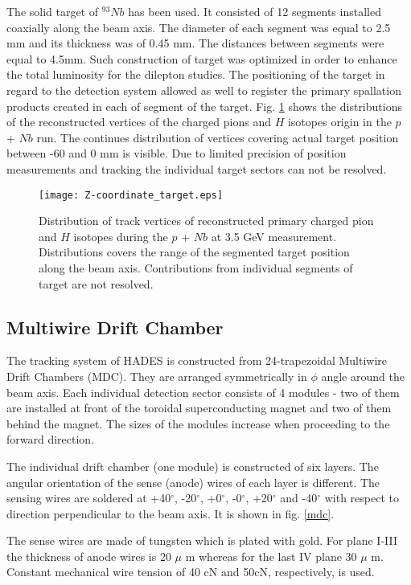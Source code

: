 The solid target of $^{93}Nb$ has been used. 
It consisted of 12 segments installed coaxially along the beam axis.
The diameter of each segment was equal to 2.5 mm and its thickness was of 0.45 mm.
The distances between segments were equal to 4.5mm. 
Such construction of target was optimized in order to enhance the total luminosity 
for the dilepton studies. 
The positioning of the target in regard to the detection system allowed as well to register 
the primary spallation products created in each of segment of the target.
Fig. \ref{Target_reconstruction} shows the distributions of the reconstructed vertices 
of the charged pions and $H$ isotopes origin in the $p$ + $Nb$ run. The continues distribution 
of vertices covering actual target position between -60 and 0 mm is visible. 
Due to limited precision of position measurements and tracking the individual target sectors 
can not be resolved. 

\begin{figure}[H]
    \centering
    \texttt{[image: Z-coordinate\_target.eps]}
    \caption{Distribution of track vertices of reconstructed primary charged pion and $H$ isotopes 
    during the $p$ + $Nb$ at 3.5 GeV measurement. Distributions covers the range of the segmented target
    position along the beam axis. Contributions from individual segments of target are not resolved.}
    \label{Target_reconstruction}
\end{figure}

\subsection{Multiwire Drift Chamber}
The tracking system of HADES is constructed from 24-trapezoidal Multiwire Drift Chambers (MDC). 
They are arranged symmetrically in $\phi$ angle around the beam axis. 
Each individual detection sector consists of 4 modules -  two of them are installed at front 
of the toroidal superconducting magnet and two of them behind the magnet.
The sizes of the modules increase when proceeding to the forward direction. 

The individual drift chamber (one module) is constructed of six layers. 
The angular orientation of the sense (anode) wires of each layer is different. 
The sensing wires are soldered at +40$^\circ$,  -20$^\circ$, +0$^\circ$, -0$^\circ$, +20$^\circ$ and -40$^\circ$ 
with respect to direction perpendicular to the beam axis. It is shown in fig. \ref{mdc}.   

The sense wires are made of tungsten which is plated with gold. 
For plane I-III the thickness of anode wires is 20 $\mu$ m whereas for the last IV plane 30 $\mu$ m.
Constant mechanical wire tension of 40 cN and 50cN, respectively, is used. 

